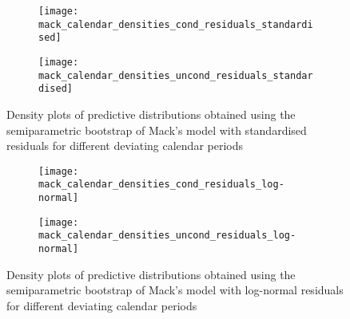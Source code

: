 \documentclass[a4paper]{book}
\begin{document}
\begin{landscape}
  \setlength\tabcolsep{2pt}
  \renewcommand{\arraystretch}{1.2}
  
\end{landscape}

\begin{landscape}
  \begin{figure}
    \begin{subfigure}{0.5\linewidth}
      \centering
      \texttt{[image: mack\_calendar\_densities\_cond\_residuals\_standardised]}
      \label{fig:mack-calendar-cond-semiparam-standard}
    \end{subfigure}
    \begin{subfigure}{0.5\linewidth}
      \centering
      \texttt{[image: mack\_calendar\_densities\_uncond\_residuals\_standardised]}
      \label{fig:mack-calendar-uncond-semiparam-standard}
    \end{subfigure}
    \caption{Density plots of predictive distributions obtained using the semiparametric bootstrap of Mack's model with standardised residuals for different deviating calendar periods}
  \end{figure}
\end{landscape}

\begin{landscape}
  \begin{figure}
    \begin{subfigure}{0.5\linewidth}
      \centering
      \texttt{[image: mack\_calendar\_densities\_cond\_residuals\_log-normal]}
      \label{fig:mack-calendar-cond-semiparam-log-normal}
    \end{subfigure}
    \begin{subfigure}{0.5\linewidth}
      \centering
      \texttt{[image: mack\_calendar\_densities\_uncond\_residuals\_log-normal]}
      \label{fig:mack-calendar-uncond-semiparam-log-normal}
    \end{subfigure}
    \caption{Density plots of predictive distributions obtained using the semiparametric bootstrap of Mack's model with log-normal residuals for different deviating calendar periods}
  \end{figure}
\end{landscape}
\end{document}
